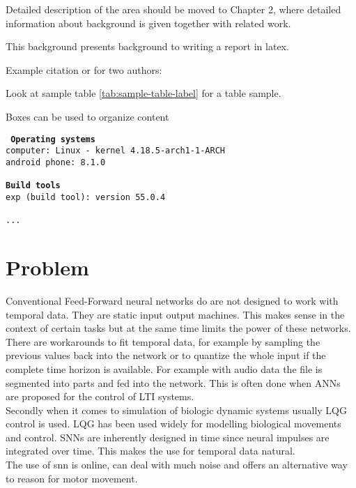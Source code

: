 Detailed description of the area should be moved to Chapter 2, where detailed information about background is given together with related work.




This background presents background to writing a report in latex.


Example citation \cite{Jones2017} or for two authors: \cite{Jones2017, Liu2017}

Look at sample table \ref{tab:sample-table-label} for a table sample.



Boxes can be used to organize content

\begin{tcolorbox}[title={Development environment for prototype}]
	\tt{
		\textbf{Operating systems }\\
		computer: Linux - kernel 4.18.5-arch1-1-ARCH\\
		android phone: 8.1.0\\
		~\\
		\textbf{Build tools}\\
		exp (build tool): version 55.0.4\\
		~\\
		...
	}
\end{tcolorbox}

\section{Problem}




Conventional Feed-Forward neural networks do are not designed to work with temporal data. They are static input output machines. This makes sense in the context of certain tasks but at the same time limits the power of these networks. There are workarounds to fit temporal data, for example by sampling the previous values back into the network  or to quantize the whole input if the complete time horizon is available. For example with audio data the file is segmented into parts and fed into the network.
This is often done when \acp{ANN} are proposed for the control of LTI systems.\\
Secondly when it comes to simulation of biologic dynamic systems usually LQG control is used. LQG has been used widely for modelling biological movements and control.
\acp{SNN} are inherently designed in time since neural impulses are integrated over time. This makes the use for temporal data natural.\\
The use of snn is online, can deal with much noise and offers an alternative way to reason for motor movement.


